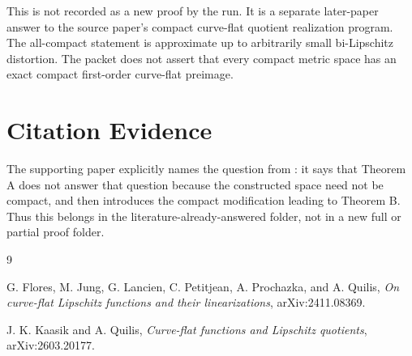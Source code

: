 \documentclass[11pt]{amsart}
\begin{document}
This is not recorded as a new proof by the run. It is a separate
later-paper answer to the source paper's compact curve-flat quotient
realization program. The all-compact statement is approximate up to
arbitrarily small bi-Lipschitz distortion. The packet does not assert
that every compact metric space has an exact compact first-order
curve-flat preimage.

\section*{Citation Evidence}

The supporting paper explicitly names the question from
\cite{FJLPPQ2024}: it says that Theorem A does not answer that question
because the constructed space need not be compact, and then introduces
the compact modification leading to Theorem B. Thus this belongs in the
literature-already-answered folder, not in a new full or partial proof
folder.

\begin{thebibliography}{9}

G. Flores, M. Jung, G. Lancien, C. Petitjean, A. Prochazka, and
A. Quilis,
\emph{On curve-flat Lipschitz functions and their linearizations},
arXiv:2411.08369.

J. K. Kaasik and A. Quilis,
\emph{Curve-flat functions and Lipschitz quotients},
arXiv:2603.20177.

\end{thebibliography}
\end{document}
